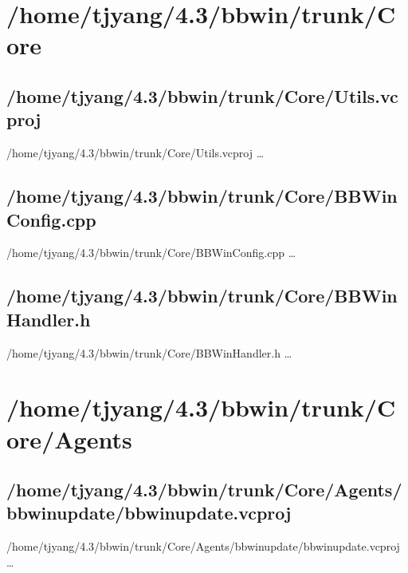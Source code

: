 \section{/home/tjyang/4.3/bbwin/trunk/Core}

\subsection{/home/tjyang/4.3/bbwin/trunk/Core/Utils.vcproj}
\lstset{numberstyle=\tiny,numbers=left,
   breaklines=true,
   stepnumber=1,numbersep=5pt,firstnumber=1,
   xleftmargin=12pt,showstringspaces=false}
\noindent /home/tjyang/4.3/bbwin/trunk/Core/Utils.vcproj  \ldots



\subsection{/home/tjyang/4.3/bbwin/trunk/Core/BBWinConfig.cpp}
\lstset{numberstyle=\tiny,numbers=left,
   breaklines=true,
   stepnumber=1,numbersep=5pt,firstnumber=1,
   xleftmargin=12pt,showstringspaces=false}
\noindent /home/tjyang/4.3/bbwin/trunk/Core/BBWinConfig.cpp  \ldots



\subsection{/home/tjyang/4.3/bbwin/trunk/Core/BBWinHandler.h}
\lstset{numberstyle=\tiny,numbers=left,
   breaklines=true,
   stepnumber=1,numbersep=5pt,firstnumber=1,
   xleftmargin=12pt,showstringspaces=false}
\noindent /home/tjyang/4.3/bbwin/trunk/Core/BBWinHandler.h  \ldots



\section{/home/tjyang/4.3/bbwin/trunk/Core/Agents}


\subsection{/home/tjyang/4.3/bbwin/trunk/Core/Agents/bbwinupdate/bbwinupdate.vcproj}
\lstset{numberstyle=\tiny,numbers=left,
   breaklines=true,
   stepnumber=1,numbersep=5pt,firstnumber=1,
   xleftmargin=12pt,showstringspaces=false}
\noindent /home/tjyang/4.3/bbwin/trunk/Core/Agents/bbwinupdate/bbwinupdate.vcproj  \ldots



